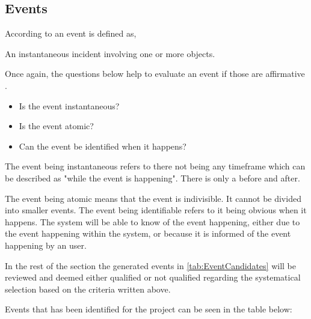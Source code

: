 \subsection{Events} \label{sec:Events}
According to \citep[p.~53]{Rod-Aalborg} an event is defined as,
\begin{defn}\label{defn:Event}
An instantaneous incident involving one or more objects.
\end{defn}
Once again, the questions below help to evaluate an event if those are affirmative \citep[p.~65]{Rod-Aalborg}.
\begin{itemize}
	\item Is the event instantaneous?
	\item Is the event atomic?
	\item Can the event be identified when it happens?
\end{itemize}

The event being instantaneous refers to there not being any timeframe which can be described as "while the event is happening". 
There is only a before and after.

The event being atomic means that the event is indivisible. 
It cannot be divided into smaller events.
The event being identifiable refers to it being obvious when it happens. The system will be able to know of the event happening, either due to the event happening within the system, or because it is informed of the event happening by an user.

In the rest of the section the generated events in \cref{tab:EventCandidates} will be reviewed and deemed either qualified or not qualified regarding the systematical selection based on the criteria written above.

Events that has been identified for the project can be seen in the table below:

